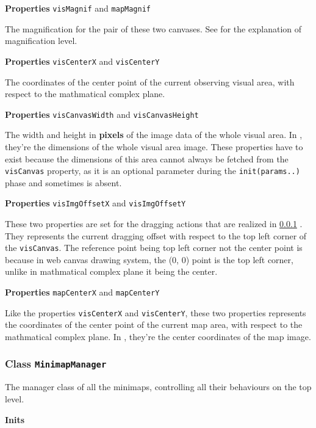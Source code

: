 \textbf{Properties} \texttt{visMagnif} and \texttt{mapMagnif}

The magnification for the pair of these two canvases. See  for the explanation of magnification level.

\textbf{Properties} \texttt{visCenterX} and \texttt{visCenterY}

The coordinates of the center point of the current observing visual area, with respect to the mathmatical complex plane.

\textbf{Properties} \texttt{visCanvasWidth} and \texttt{visCanvasHeight}

The width and height in \textbf{pixels} of the image data of the whole visual area. In , they're the dimensions of the whole visual area image. These properties have to exist because the dimensions of this area cannot always be fetched from the \texttt{visCanvas} property, as it is an optional parameter during the \texttt{init(params..)} phase and sometimes is absent.

\textbf{Properties} \texttt{visImgOffsetX} and \texttt{visImgOffsetY}

These two properties are set for the dragging actions that are realized in \ref{chap4:minimapmanager} . They represents the current dragging offset with respect to the top left corner of the \texttt{visCanvas}. The reference point being top left corner not the center point is because in web canvas drawing system, the (0, 0) point is the top left corner, unlike in mathmatical complex plane it being the center.

\textbf{Properties} \texttt{mapCenterX} and \texttt{mapCenterY}

Like the properties \texttt{visCenterX} and \texttt{visCenterY}, these two properties represents the coordinates of the center point of the current \gls{map} area, with respect to the mathmatical complex plane. In , they're the center coordinates of the \gls{map} image.

\subsubsection{Class \texttt{MinimapManager}}\label{chap4:minimapmanager}

The manager class of all the minimaps, controlling all their behaviours on the top level.

\textbf{Inits}


